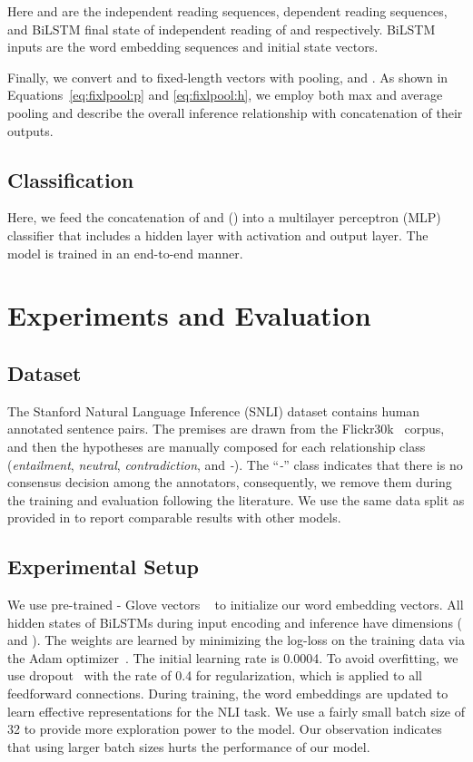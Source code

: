\documentclass[11pt,a4paper]{article}
\begin{document}
	
	
	
	
	
	
	
	\noindent Here  and  are the independent reading sequences, dependent reading sequences, and BiLSTM final state of independent reading of  and  respectively. BiLSTM inputs are the word embedding sequences and initial state vectors. 
	
	Finally, we convert  and  to fixed-length vectors with pooling,  and . As shown in Equations~\ref{eq:fixlpool:p} and \ref{eq:fixlpool:h}, we employ both max and average pooling and describe the overall inference relationship with concatenation of their outputs.
	
	
	
	
	\subsection{Classification}
	Here, we feed the concatenation of  and  () into a multilayer perceptron (MLP) classifier that includes a hidden layer with  activation and  output layer. The model is trained in an end-to-end manner.
	
	
	
		
\section{Experiments and Evaluation}
	
	\subsection{Dataset} \label{sec:data:snli}
	The Stanford Natural Language Inference (SNLI) dataset contains  human annotated sentence pairs. The premises are drawn from the Flickr30k~\cite{flickr} corpus, and then the hypotheses are manually composed for each relationship class (\emph{entailment}, \emph{neutral}, \emph{contradiction}, and \emph{-}). The ``\emph{-}'' class indicates that there is no consensus decision among the annotators, consequently, we remove them during the training and evaluation following the literature. We use the same data split as provided in \citet{snli} to report comparable results with other models.	
	
	\subsection{Experimental Setup} \label{sec:exp_s}
	We use pre-trained - Glove  vectors ~\cite{glove} to initialize our word embedding vectors. All hidden states of BiLSTMs during input encoding and inference have  dimensions ( and ). The weights are learned by minimizing the log-loss on the training data via the Adam optimizer~\cite{adam}. The initial learning rate is 0.0004. To avoid overfitting, we use dropout~\cite{dropout} with the rate of 0.4 for regularization, which is applied to all feedforward connections. During training, the word embeddings are updated to learn effective representations for the NLI task. We use a fairly small batch size of 32 to provide more exploration power to the model. Our observation indicates that using larger batch sizes hurts the performance of our model. 
	
\end{document}
